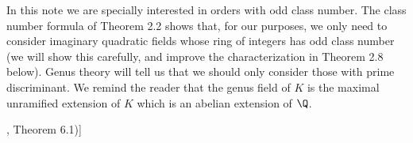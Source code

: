 In this note we are specially interested in orders with odd class number. The class number formula of Theorem 2.2 shows that, for our purposes, we only need to consider imaginary quadratic fields whose ring of integers has odd class number (we will show this carefully, and improve the characterization in Theorem 2.8 below). Genus theory will tell us that we should only consider those with prime discriminant. We remind the reader that the genus field of $K$ is the maximal unramified extension of $K$ which is an abelian extension of $\Q$.


\begin{thm}[3 ([Cox89], Theorem 6.1)] %

\end{thm}


